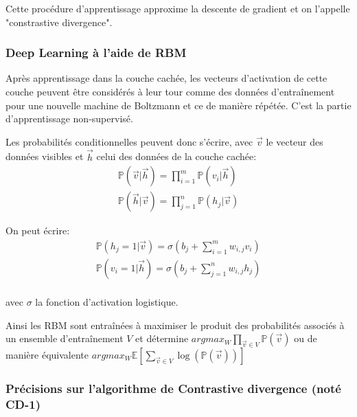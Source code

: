 \documentclass{article}
\begin{document}
\noindent Cette procédure d'apprentissage approxime la descente de gradient et on l'appelle "constrastive divergence".

\subsubsection{Deep Learning à l'aide de RBM}


\noindent Après apprentissage dans la couche cachée, les vecteurs d'activation de cette couche peuvent être considérés à leur tour comme des données d'entraînement pour une nouvelle machine de Boltzmann et ce de manière répétée. C'est la partie d'apprentissage non-supervisé.

\noindent Les probabilités conditionnelles peuvent donc s'écrire, avec $\vec{v}$ le vecteur des données visibles et $\vec{h}$ celui des données de la couche cachée:
\begin{align*}
\mathbb{P}(\vec{v}|\vec{h})=\prod_{i=1}^m \mathbb{P}(v_i|\vec{h})\\
\mathbb{P}(\vec{h}|\vec{v})=\prod_{j=1}^n \mathbb{P}(h_j|\vec{v})
\end{align*}

\noindent On peut écrire:
\begin{align*}
\mathbb{P}(h_j=1|\vec{v})=\sigma\left(b_j+\sum_{i=1}^m w_{i,j} v_i\right)\\
\mathbb{P}(v_i=1|\vec{h})=\sigma\left(b_j+\sum_{j=1}^n w_{i,j} h_j\right)\\
\end{align*}

\noindent avec $\sigma$ la fonction d'activation logistique.

\noindent Ainsi les RBM sont entraînées à maximiser le produit des probabilités associés à un ensemble d'entraînement $V$ et détermine $argmax_W \prod_{\vec{v}\in V}\mathbb{P}(\vec{v})$ ou de manière équivalente $argmax_W \mathbb{E}\left[\sum_{\vec{v}\in V} \log\left(\mathbb{P}(\vec{v})\right)\right]$

\subsubsection{Précisions sur l'algorithme de Contrastive divergence (noté CD-1)}
\end{document}
